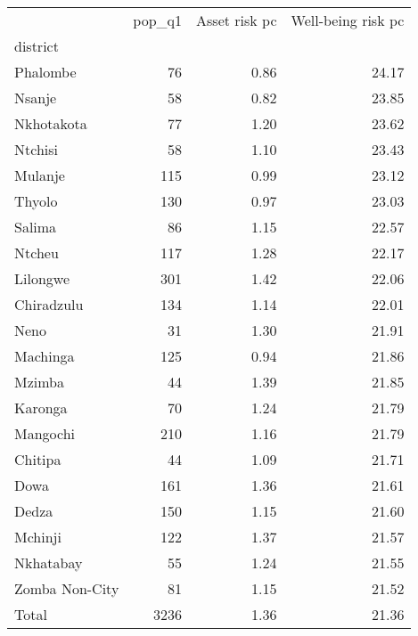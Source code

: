 \begin{tabular}{lrrr}
\toprule
{} &  pop\_q1 &  Asset risk pc &  Well-being risk pc \\
district       &         &                &                     \\
\midrule
Phalombe       &      76 &           0.86 &               24.17 \\
Nsanje         &      58 &           0.82 &               23.85 \\
Nkhotakota     &      77 &           1.20 &               23.62 \\
Ntchisi        &      58 &           1.10 &               23.43 \\
Mulanje        &     115 &           0.99 &               23.12 \\
Thyolo         &     130 &           0.97 &               23.03 \\
Salima         &      86 &           1.15 &               22.57 \\
Ntcheu         &     117 &           1.28 &               22.17 \\
Lilongwe       &     301 &           1.42 &               22.06 \\
Chiradzulu     &     134 &           1.14 &               22.01 \\
Neno           &      31 &           1.30 &               21.91 \\
Machinga       &     125 &           0.94 &               21.86 \\
Mzimba         &      44 &           1.39 &               21.85 \\
Karonga        &      70 &           1.24 &               21.79 \\
Mangochi       &     210 &           1.16 &               21.79 \\
Chitipa        &      44 &           1.09 &               21.71 \\
Dowa           &     161 &           1.36 &               21.61 \\
Dedza          &     150 &           1.15 &               21.60 \\
Mchinji        &     122 &           1.37 &               21.57 \\
Nkhatabay      &      55 &           1.24 &               21.55 \\
Zomba Non-City &      81 &           1.15 &               21.52 \\
Total          &    3236 &           1.36 &               21.36 \\

\end{tabular}
